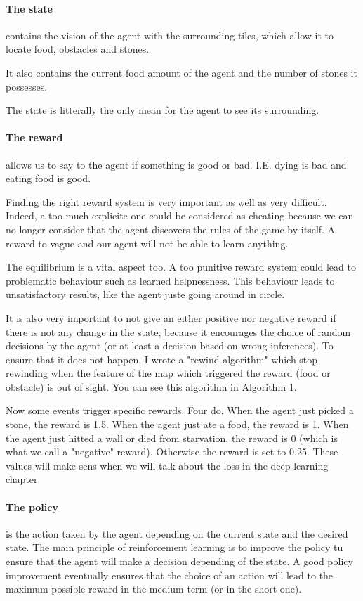 \documentclass{article}
\begin{document}
\paragraph{The state}
contains the vision of the agent with the surrounding tiles, which allow it to locate food, obstacles and stones. \par
It also contains the current food amount of the agent and the number of stones it possesses. \par
The state is litterally the only mean for the agent to see its surrounding.

\paragraph{The reward}
allows us to say to the agent if something is good or bad. I.E. dying is bad and eating food is good.\par 
Finding the right reward system is very important as well as very difficult. Indeed, a too much explicite one could be considered as cheating because we can no longer consider that the agent discovers the rules of the game by itself. A reward to vague and our agent will not be able to learn anything.\par 
The equilibrium is a vital aspect too. A too punitive reward system could lead to problematic behaviour such as learned helpnessness\cite{wiki:learned_helplessness}. This behaviour leads to unsatisfactory results, like the agent juste going around in circle.\par
It is also very important to not give an either positive nor negative reward if there is not any change in the state, because it encourages the choice of random decisions by the agent (or at least a decision based on wrong inferences). To ensure that it does not happen, I wrote a "rewind algorithm" which stop rewinding when the feature of the map which triggered the reward (food or obstacle) is out of sight. You can see this algorithm in Algorithm 1.\par
Now some events trigger specific rewards. Four do. When the agent just picked a stone, the reward is 1.5. When the agent just ate a food, the reward is 1. When the agent just hitted a wall or died from starvation, the reward is 0 (which is what we call a "negative" reward). Otherwise the reward is set to 0.25. These values will make sens when we will talk about the loss in the deep learning chapter.

\paragraph{The policy}
is the action taken by the agent depending on the current state and the desired state. The main principle of reinforcement learning is to improve the policy tu ensure that the agent will make a decision depending of the state. A good policy improvement eventually ensures that the choice of an action will lead to the maximum possible reward in the medium term (or in the short one).
\end{document}
